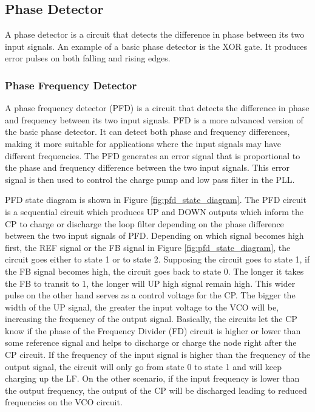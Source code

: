 \subsection{Phase Detector}
A phase detector is a circuit that detects the difference in phase between its two input
signals. An example of a basic phase detector is the XOR gate. It produces error pulses on both
falling and rising edges.

\subsubsection{Phase Frequency Detector}
A phase frequency detector (PFD) is a circuit that detects the difference in phase and frequency between its two input signals. PFD is a more advanced version of the basic phase detector. It can detect both phase and frequency differences, making it more suitable for applications where the input signals may have different frequencies. The PFD generates an error signal that is proportional to the phase and frequency difference between the two input signals. This error signal is then used to control the charge pump and low pass filter in the PLL.


PFD state diagram is shown in Figure \ref{fig:pfd_state_diagram}. 
The PFD circuit is a sequential circuit which produces UP and DOWN outputs which inform the CP to charge or discharge the loop
filter depending on the phase difference between the two input signals of PFD. Depending on which signal becomes high first, the REF signal or the FB signal in Figure \ref{fig:pfd_state_diagram}, the circuit goes either to state 1 or to state 2. Supposing the circuit goes to state 1, if the FB signal becomes high, the circuit goes back to state 0. The longer it takes the FB to transit to 1, the longer will UP high signal remain high. This wider pulse on the other hand serves as a control voltage for the CP. The bigger the width of the UP signal, the greater the input voltage to the VCO will be, increasing the frequency of the output signal. Basically, the circuits let the CP know if the phase of the Frequency Divider (FD) circuit is higher or lower than some reference signal and helps to discharge or charge the node right after the CP circuit. If the frequency of the input signal is higher than the frequency of the output signal, the circuit will only go from state 0 to state 1 and will keep charging up the LF. On the other scenario, if the input frequency is lower than the output frequency, the output of the CP will be discharged leading to reduced frequencies on the VCO circuit.

